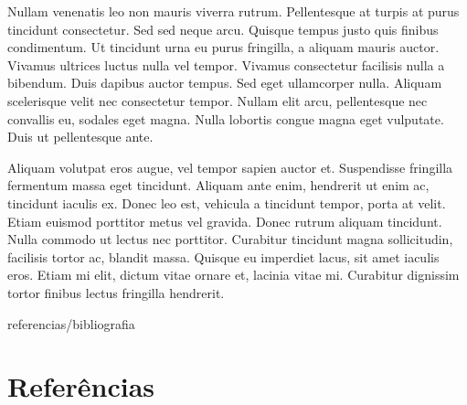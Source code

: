 \documentclass[book,A4paper,10pt,twoside,oldfontcommands]{memoir}\usepackage[]{graphicx}\usepackage[usenames,dvipsnames]{color}
\begin{document}
\begin{btUnit}
Nullam venenatis leo non mauris viverra rutrum. Pellentesque at turpis
at purus tincidunt consectetur. Sed sed neque arcu. Quisque tempus
justo quis finibus condimentum. Ut tincidunt urna eu purus fringilla,
a aliquam mauris auctor. Vivamus ultrices luctus nulla vel tempor.
Vivamus consectetur facilisis nulla a bibendum. Duis dapibus auctor
tempus. Sed eget ullamcorper nulla. Aliquam scelerisque velit nec
consectetur tempor. Nullam elit arcu, pellentesque nec convallis eu,
sodales eget magna. Nulla lobortis congue magna eget vulputate. Duis
ut pellentesque ante.

Aliquam volutpat eros augue, vel tempor sapien auctor et. Suspendisse
fringilla fermentum massa eget tincidunt. Aliquam ante enim, hendrerit
ut enim ac, tincidunt iaculis ex. Donec leo est, vehicula a tincidunt
tempor, porta at velit. Etiam euismod porttitor metus vel gravida.
Donec rutrum aliquam tincidunt. Nulla commodo ut lectus nec porttitor.
Curabitur tincidunt magna sollicitudin, facilisis tortor ac, blandit
massa. Quisque eu imperdiet lacus, sit amet iaculis eros. Etiam mi
elit, dictum vitae ornare et, lacinia vitae mi. Curabitur dignissim
tortor finibus lectus fringilla hendrerit.

\begin{btSect}{referencias/bibliografia}
\section*{Referências}
\btPrintCited
\end{btSect}

\end{btUnit}


\end{document}
